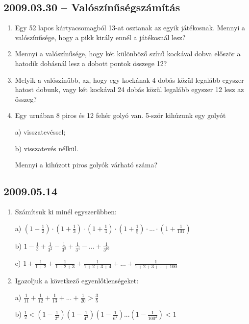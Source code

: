 \subsection*{2009.03.30 -- Valószínűségszámítás}
 
\begin{enumerate}
 
\item Egy 52 lapos kártyacsomagból 13-at osztanak az egyik játékosnak. Mennyi a valószínűsége, hogy a pikk király ennél a játékosnál lesz?
 
\item Mennyi a valószínűsége, hogy két különböző színű kockával dobva először a hatodik dobásnál lesz a  dobott pontok összege 12?
 
\item Melyik a valószínűbb, az, hogy egy kockának 4 dobás közül legalább egyszer hatost dobunk, vagy két kockával 24 dobás közül legalább egyszer 12 lesz az összeg?
 
\item Egy urnában 8 piros és 12 fehér golyó van. 5-ször kihúzunk egy golyót
 
   a) visszatevéssel;
   
   b) visszatevés nélkül.
   
Mennyi a kihúzott piros golyók várható száma?
 
\end{enumerate}
 
\subsection*{2009.05.14}
 
\begin{enumerate}
 
\item Számítsuk ki minél egyszerűbben:
 
a) $(1+\displaystyle{\frac{1}{2}})\cdot(1+\displaystyle{\frac{1}{3}})\cdot(1+\displaystyle{\frac{1}{4}})\cdot(1+\displaystyle{\frac{1}{5}})\cdot...\cdot (1+\displaystyle{\frac{1}{101}})$
 
b) $1-\displaystyle{\frac{1}{3}}+\displaystyle{\frac{1}{3^2}}-\displaystyle{\frac{1}{3^3}}+\displaystyle{\frac{1}{3^4}}-...+\displaystyle{\frac{1}{3^{10}}}$
 
c) $1+\displaystyle{\frac{1}{1+2}}+\displaystyle{\frac{1}{1+2+3}}+\displaystyle{\frac{1}{1+2+3+4}}+...+\displaystyle{\frac{1}{1+2+3+...+100}}$
 
\item Igazoljuk a következő egyenlőtlenségeket:
 
a) $\displaystyle{\frac{1}{11}}+\displaystyle{\frac{1}{12}}+\displaystyle{\frac{1}{13}}+...+\displaystyle{\frac{1}{20}}>\displaystyle{\frac{3}{5}}$
 
b) $\displaystyle{\frac{1}{2}}<(1-\displaystyle{\frac{1}{2^2}})(1-\displaystyle{\frac{1}{4^2}})(1-\displaystyle{\frac{1}{6^2}})...(1-\displaystyle{\frac{1}{100^2}})<1$
 
 
\end{enumerate}


